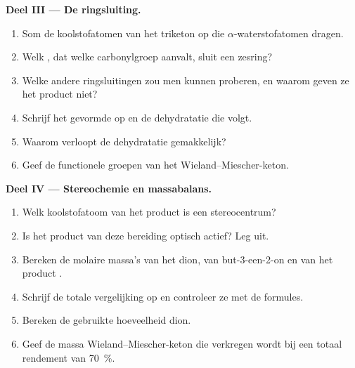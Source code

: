 \begin{problem}
\medskip
\noindent\textbf{Deel III --- De ringsluiting.}
\begin{enumerate}[resume]
  \item Som de koolstofatomen van het triketon op die $\alpha$-waterstofatomen dragen.
  \item Welk , dat welke carbonylgroep aanvalt, sluit een zesring?
  \item Welke andere ringsluitingen zou men kunnen proberen, en waarom geven ze het product niet?
  \item Schrijf het gevormde  op en de dehydratatie die volgt.
  \item Waarom verloopt de dehydratatie gemakkelijk?
  \item Geef de functionele groepen van het Wieland--Miescher-keton.
\end{enumerate}

\medskip
\noindent\textbf{Deel IV --- Stereochemie en massabalans.}
\begin{enumerate}[resume]
  \item Welk koolstofatoom van het product is een stereocentrum?
  \item Is het product van deze bereiding optisch actief? Leg uit.
  \item Bereken de molaire massa's van het dion, van but-3-een-2-on en van het product
        .
  \item Schrijf de totale vergelijking op en controleer ze met de formules.
  \item Bereken de gebruikte hoeveelheid dion.
  \item Geef de massa Wieland--Miescher-keton die verkregen wordt bij een totaal rendement van 70~\%.
\end{enumerate}
\end{problem}
